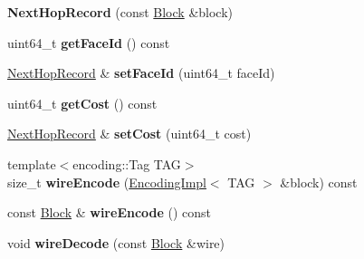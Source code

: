 \begin{DoxyCompactItemize}
\item 
{\bfseries Next\+Hop\+Record} (const \hyperlink{classndn_1_1Block}{Block} \&block)\hypertarget{classndn_1_1nfd_1_1NextHopRecord_ab36620d875bbc4bf6109dcd56197b760}{}\label{classndn_1_1nfd_1_1NextHopRecord_ab36620d875bbc4bf6109dcd56197b760}

\item 
uint64\+\_\+t {\bfseries get\+Face\+Id} () const\hypertarget{classndn_1_1nfd_1_1NextHopRecord_ad44be3983bff2b234f3276597d4914eb}{}\label{classndn_1_1nfd_1_1NextHopRecord_ad44be3983bff2b234f3276597d4914eb}

\item 
\hyperlink{classndn_1_1nfd_1_1NextHopRecord}{Next\+Hop\+Record} \& {\bfseries set\+Face\+Id} (uint64\+\_\+t face\+Id)\hypertarget{classndn_1_1nfd_1_1NextHopRecord_a6bc447fedc1fbf6552a180707aadfdf0}{}\label{classndn_1_1nfd_1_1NextHopRecord_a6bc447fedc1fbf6552a180707aadfdf0}

\item 
uint64\+\_\+t {\bfseries get\+Cost} () const\hypertarget{classndn_1_1nfd_1_1NextHopRecord_ada4ee73ea76c28bead0944513fe4da35}{}\label{classndn_1_1nfd_1_1NextHopRecord_ada4ee73ea76c28bead0944513fe4da35}

\item 
\hyperlink{classndn_1_1nfd_1_1NextHopRecord}{Next\+Hop\+Record} \& {\bfseries set\+Cost} (uint64\+\_\+t cost)\hypertarget{classndn_1_1nfd_1_1NextHopRecord_a9681ef0574db290bff5da3d52873c5f1}{}\label{classndn_1_1nfd_1_1NextHopRecord_a9681ef0574db290bff5da3d52873c5f1}

\item 
{\footnotesize template$<$encoding\+::\+Tag T\+AG$>$ }\\size\+\_\+t {\bfseries wire\+Encode} (\hyperlink{classndn_1_1encoding_1_1EncodingImpl}{Encoding\+Impl}$<$ T\+AG $>$ \&block) const\hypertarget{classndn_1_1nfd_1_1NextHopRecord_a81c04d1a5bb4a2dff8f7ae4d1b3498fd}{}\label{classndn_1_1nfd_1_1NextHopRecord_a81c04d1a5bb4a2dff8f7ae4d1b3498fd}

\item 
const \hyperlink{classndn_1_1Block}{Block} \& {\bfseries wire\+Encode} () const\hypertarget{classndn_1_1nfd_1_1NextHopRecord_af0a455a7ac94a7f1bff41d06ae952187}{}\label{classndn_1_1nfd_1_1NextHopRecord_af0a455a7ac94a7f1bff41d06ae952187}

\item 
void {\bfseries wire\+Decode} (const \hyperlink{classndn_1_1Block}{Block} \&wire)\hypertarget{classndn_1_1nfd_1_1NextHopRecord_a186c450c2540522be1312c0297560f19}{}\label{classndn_1_1nfd_1_1NextHopRecord_a186c450c2540522be1312c0297560f19}

\end{DoxyCompactItemize}


